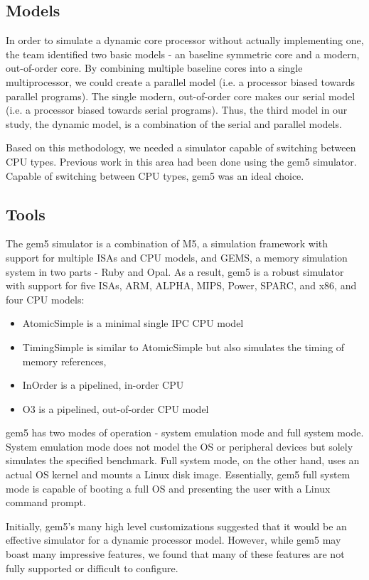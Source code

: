 \subsection{Models}
In order to simulate a dynamic core processor without actually implementing one, the team identified two basic models - an baseline symmetric core and a modern, out-of-order core. By combining multiple baseline cores into a single multiprocessor, we could create a parallel model (i.e. a processor biased towards parallel programs). The single modern, out-of-order core makes our serial model (i.e. a processor biased towards serial programs). Thus, the third model in our study, the dynamic model, is a combination of the serial and parallel models.

Based on this methodology, we needed a simulator capable of switching between CPU types. Previous work in this area had been done using the gem5 simulator. Capable of switching between CPU types, gem5 was an ideal choice.

\subsection{Tools}
The gem5 simulator \cite{gem5} is a combination of M5, a simulation framework with support for multiple ISAs and CPU models, and GEMS, a memory simulation system in two parts - Ruby and Opal. As a result, gem5 is a robust simulator with support for five ISAs, ARM, ALPHA, MIPS, Power, SPARC, and x86, and four CPU models:

\begin{itemize}
	\item AtomicSimple is a minimal single IPC CPU model
	\item TimingSimple is similar to AtomicSimple but also simulates the timing of memory references,
	\item InOrder is a pipelined, in-order CPU
	\item O3 is a pipelined, out-of-order CPU model
\end{itemize}

gem5 has two modes of operation - system emulation mode and full system mode. System emulation mode does not model the OS or peripheral devices but solely simulates the specified benchmark. Full system mode, on the other hand, uses an actual OS kernel and mounts a Linux disk image. Essentially, gem5 full system mode is capable of booting a full OS and presenting the user with a Linux command prompt.

Initially, gem5's many high level customizations suggested that it would be an effective simulator for a dynamic processor model. However, while gem5 may boast many impressive features, we found that many of these features are not fully supported or difficult to configure.


